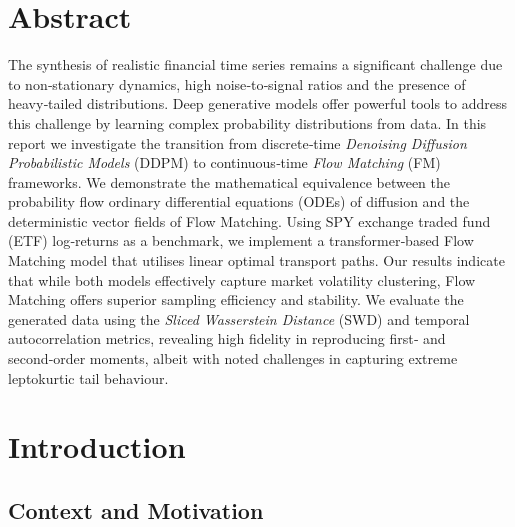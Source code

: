 
\section*{Abstract}
\label{sec:abstract}

The synthesis of realistic financial time series remains a
significant challenge due to non‑stationary dynamics, high
noise‑to‑signal ratios and the presence of heavy‑tailed distributions.
Deep generative models offer powerful tools to address this challenge
by learning complex probability distributions from data.  In this
report we investigate the transition from discrete‑time \emph{Denoising
Diffusion Probabilistic Models} (DDPM) to continuous‑time \emph{Flow
Matching} (FM) frameworks.  We demonstrate the mathematical
equivalence between the probability flow ordinary differential
equations (ODEs) of diffusion and the deterministic vector fields of
Flow Matching.  Using SPY exchange traded fund (ETF) log‑returns as a
benchmark, we implement a transformer‑based Flow Matching model that
utilises linear optimal transport paths.  Our results indicate that
while both models effectively capture market volatility clustering,
Flow Matching offers superior sampling efficiency and stability.  We
evaluate the generated data using the \emph{Sliced Wasserstein
Distance} (SWD) and temporal autocorrelation metrics, revealing high
fidelity in reproducing first‑ and second‑order moments, albeit with
noted challenges in capturing extreme leptokurtic tail behaviour.

\section{Introduction}
\label{sec:introduction}

\subsection{Context and Motivation}

